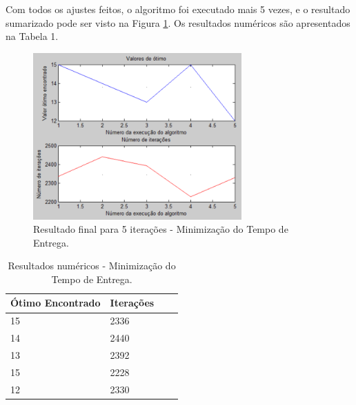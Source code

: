 \documentclass[conference]{IEEEtran}
\begin{document}
Com todos os ajustes feitos, o algoritmo foi executado mais 5 vezes, e o resultado sumarizado pode ser visto na Figura \ref{fig:mult-result-7}. Os resultados numéricos são apresentados na Tabela 1.

	\begin{figure}[h]
		\centering
		\includegraphics[width=8cm]{img/mult-result-7.png}
		\caption{Resultado final para 5 iterações - Minimização do Tempo de Entrega.}
		\label{fig:mult-result-7}
	\end{figure}
	
	\begin{table}
		\centering
		\begin{tabular}{ | l | l | l | l |}
			\hline
			Ótimo Encontrado & Iterações \\ \hline
			15 & 2336 \\ \hline
			14 & 2440 \\ \hline
			13 & 2392 \\ \hline
			15 & 2228 \\ \hline
			12 & 2330 \\ \hline
		\end{tabular}
		\label{table:result}
		\caption{Resultados numéricos - Minimização do Tempo de Entrega.}
	\end{table}

%
\end{document}
